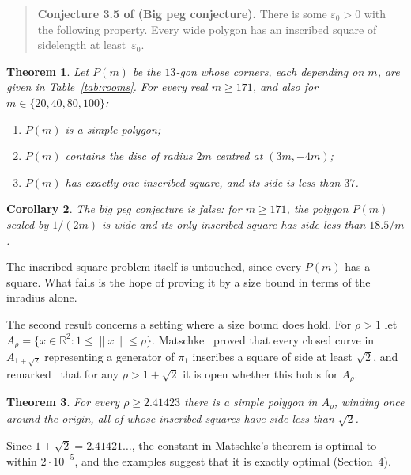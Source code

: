 \documentclass[11pt,a4paper]{article}
\newtheorem{theorem}{Theorem}
\newtheorem{corollary}[theorem]{Corollary}
\theoremstyle{remark}\newtheorem{remark}[theorem]{Remark}
\begin{document}
\begin{quote}
\textbf{Conjecture 3.5 of \cite{schwartz} (Big peg conjecture).} There is some
$\varepsilon_0>0$ with the following property. Every wide polygon has an
inscribed square of sidelength at least~$\varepsilon_0$.
\end{quote}

\begin{theorem}\label{thm:rooms}
Let $P(m)$ be the $13$-gon whose corners, each depending on $m$, are given in
Table~\ref{tab:rooms}. For every real $m\ge171$, and also for
$m\in\{20,40,80,100\}$:
\begin{enumerate}
\item $P(m)$ is a simple polygon;
\item $P(m)$ contains the disc of radius $2m$ centred at $(3m,-4m)$;
\item $P(m)$ has exactly one inscribed square, and its side is less than $37$.
\end{enumerate}
\end{theorem}

\begin{corollary}
The big peg conjecture is false: for $m\ge171$, the polygon $P(m)$ scaled by
$1/(2m)$ is wide and its only inscribed square has side less than $18.5/m$.
\end{corollary}

The inscribed square problem itself is untouched, since every $P(m)$ has a square.
What fails is the hope of proving it by a size bound in terms of the inradius alone.

The second result concerns a setting where a size bound does hold. For $\rho>1$
let $A_\rho=\{x\in\mathbb R^2: 1\le\|x\|\le\rho\}$.
Matschke~\cite[Theorem~1.3]{matschke} proved that every closed curve in
$A_{1+\sqrt2}$ representing a generator of $\pi_1$ inscribes a square of side at
least $\sqrt2$, and remarked~\cite[Remark~2.6]{matschke} that for any
$\rho>1+\sqrt2$ it is open whether this holds for $A_\rho$.

\begin{theorem}\label{thm:ring}
For every $\rho\ge 2.41423$ there is a simple polygon in $A_\rho$, winding once
around the origin, all of whose inscribed squares have side less than $\sqrt2$.
\end{theorem}

Since $1+\sqrt2=2.41421\ldots$, the constant in Matschke's theorem is optimal to
within $2\cdot10^{-5}$, and the examples suggest that it is exactly optimal
(Section~4).
\end{document}
